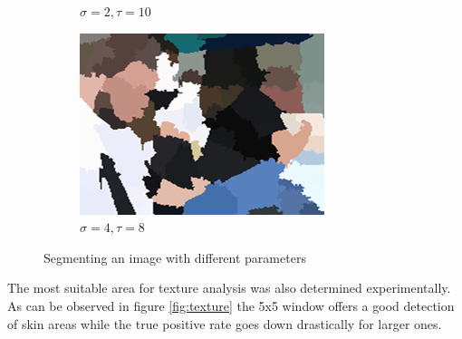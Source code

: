 \documentclass[12pt]{report}
\begin{document}
\begin{figure}[h!]
\begin{subfigure}[b]{0.3\linewidth}
			\caption{$\sigma = 2, \tau = 10$}
		\end{subfigure}
		\begin{subfigure}[b]{0.3\linewidth}
			\includegraphics[width=\linewidth]{resources/segm_4_8.png}
			\caption{$\sigma = 4, \tau = 8$}
		\end{subfigure}
		\caption{Segmenting an image with different parameters}
		\label{fig:segmentation}
	\end{figure}
	
	The most suitable area for texture analysis was also determined experimentally. As can be observed in figure \ref{fig:texture} the 5x5 window offers a good detection of skin areas while the true positive rate goes down drastically for larger ones.
	
\end{document}
